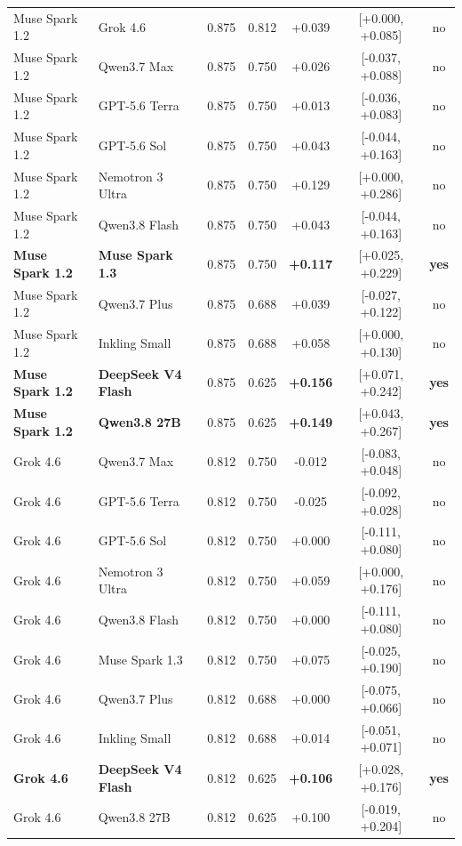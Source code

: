 \begin{longtable}{llrrccc}
Muse Spark 1.2 & Grok 4.6 & 0.875 & 0.812 & +0.039 & [+0.000, +0.085] & no \\
Muse Spark 1.2 & Qwen3.7 Max & 0.875 & 0.750 & +0.026 & [-0.037, +0.088] & no \\
Muse Spark 1.2 & GPT-5.6 Terra & 0.875 & 0.750 & +0.013 & [-0.036, +0.083] & no \\
Muse Spark 1.2 & GPT-5.6 Sol & 0.875 & 0.750 & +0.043 & [-0.044, +0.163] & no \\
Muse Spark 1.2 & Nemotron 3 Ultra & 0.875 & 0.750 & +0.129 & [+0.000, +0.286] & no \\
Muse Spark 1.2 & Qwen3.8 Flash & 0.875 & 0.750 & +0.043 & [-0.044, +0.163] & no \\
\textbf{Muse Spark 1.2} & \textbf{Muse Spark 1.3} & 0.875 & 0.750 & \textbf{+0.117} & [+0.025, +0.229] & \textbf{yes} \\
Muse Spark 1.2 & Qwen3.7 Plus & 0.875 & 0.688 & +0.039 & [-0.027, +0.122] & no \\
Muse Spark 1.2 & Inkling Small & 0.875 & 0.688 & +0.058 & [+0.000, +0.130] & no \\
\textbf{Muse Spark 1.2} & \textbf{DeepSeek V4 Flash} & 0.875 & 0.625 & \textbf{+0.156} & [+0.071, +0.242] & \textbf{yes} \\
\textbf{Muse Spark 1.2} & \textbf{Qwen3.8 27B} & 0.875 & 0.625 & \textbf{+0.149} & [+0.043, +0.267] & \textbf{yes} \\
Grok 4.6 & Qwen3.7 Max & 0.812 & 0.750 & -0.012 & [-0.083, +0.048] & no \\
Grok 4.6 & GPT-5.6 Terra & 0.812 & 0.750 & -0.025 & [-0.092, +0.028] & no \\
Grok 4.6 & GPT-5.6 Sol & 0.812 & 0.750 & +0.000 & [-0.111, +0.080] & no \\
Grok 4.6 & Nemotron 3 Ultra & 0.812 & 0.750 & +0.059 & [+0.000, +0.176] & no \\
Grok 4.6 & Qwen3.8 Flash & 0.812 & 0.750 & +0.000 & [-0.111, +0.080] & no \\
Grok 4.6 & Muse Spark 1.3 & 0.812 & 0.750 & +0.075 & [-0.025, +0.190] & no \\
Grok 4.6 & Qwen3.7 Plus & 0.812 & 0.688 & +0.000 & [-0.075, +0.066] & no \\
Grok 4.6 & Inkling Small & 0.812 & 0.688 & +0.014 & [-0.051, +0.071] & no \\
\textbf{Grok 4.6} & \textbf{DeepSeek V4 Flash} & 0.812 & 0.625 & \textbf{+0.106} & [+0.028, +0.176] & \textbf{yes} \\
Grok 4.6 & Qwen3.8 27B & 0.812 & 0.625 & +0.100 & [-0.019, +0.204] & no \\

\end{longtable}

